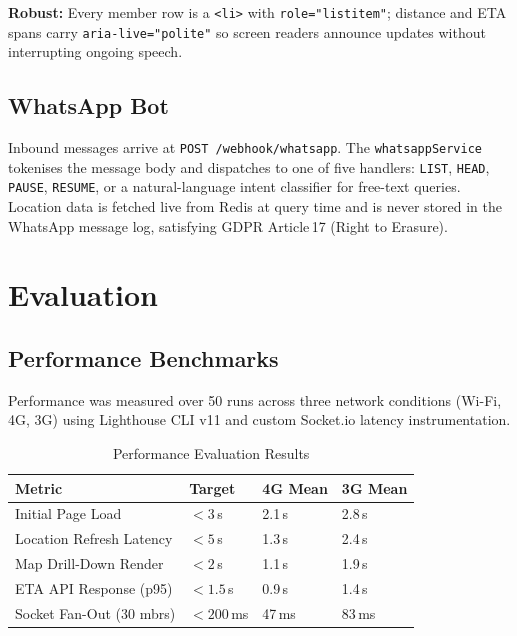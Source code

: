 \documentclass[conference]{IEEEtran}
\begin{document}
\textbf{Robust:} Every member row is a \texttt{<li>} with
\texttt{role="listitem"}; distance and ETA spans carry
\texttt{aria-live="polite"} so screen readers announce updates
without interrupting ongoing speech.

\subsection{WhatsApp Bot}

Inbound messages arrive at \texttt{POST /webhook/whatsapp}.
The \texttt{whatsappService} tokenises the message body and dispatches
to one of five handlers: \texttt{LIST}, \texttt{HEAD},
\texttt{PAUSE}, \texttt{RESUME}, or a natural-language intent
classifier for free-text queries. Location data is fetched live from
Redis at query time and is never stored in the WhatsApp message log,
satisfying GDPR Article\,17 (Right to Erasure).

\section{Evaluation}
\label{sec:eval}

\subsection{Performance Benchmarks}

Performance was measured over 50 runs across three network conditions
(Wi-Fi, 4G, 3G) using Lighthouse CLI v11 and custom Socket.io
latency instrumentation.

\begin{table}[htbp]
\caption{Performance Evaluation Results}
\label{tab:perf}
\renewcommand{\arraystretch}{1.2}
\begin{tabularx}{\columnwidth}{@{}Xlll@{}}
\toprule
\textbf{Metric} & \textbf{Target} & \textbf{4G Mean} & \textbf{3G Mean} \\
\midrule
Initial Page Load        & $<3$\,s    & 2.1\,s  & 2.8\,s  \\
Location Refresh Latency & $<5$\,s    & 1.3\,s  & 2.4\,s  \\
Map Drill-Down Render    & $<2$\,s    & 1.1\,s  & 1.9\,s  \\
ETA API Response (p95)   & $<1.5$\,s  & 0.9\,s  & 1.4\,s  \\
Socket Fan-Out (30 mbrs) & $<200$\,ms & 47\,ms  & 83\,ms  \\
\bottomrule
\end{tabularx}
\end{table}
\end{document}
